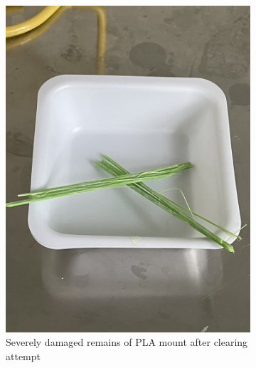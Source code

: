 \begin{figure}[H]
\centering
\begin{subfigure}[t]{0.4\textwidth}
    \centering
    \includegraphics[width=1\linewidth]{Images/PLA_CUBIC_A.jpg}
    \caption{Severely damaged remains of PLA mount after clearing attempt}
    \end{subfigure}
    ~
    \begin{subfigure}[t]{0.4\textwidth}
    \centering

\end{subfigure}
\end{figure}
